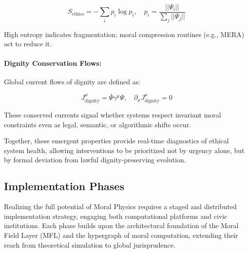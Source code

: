 \documentclass{article}
\theoremstyle{plain}
\theoremstyle{claimstyle}
\begin{document}
\[
S_{\text{ethics}} = -\sum_i p_i \log p_i, \quad p_i = \frac{||\Psi_i||}{\sum_j ||\Psi_j||}
\]

High entropy indicates fragmentation; moral compression routines (e.g., MERA) act to reduce it.

\paragraph{Dignity Conservation Flows:}

Global current flows of dignity are defined as:

\[
J^\mu_{\text{dignity}} = \bar{\Psi} \gamma^\mu \Psi, \quad \partial_\mu J^\mu_{\text{dignity}} = 0
\]

These conserved currents signal whether systems respect invariant moral constraints even as legal, semantic, or algorithmic shifts occur.

\bigskip

Together, these emergent properties provide real-time diagnostics of ethical system health, allowing interventions to be prioritized not by urgency alone, but by formal deviation from lawful dignity-preserving evolution.

\subsection{Implementation Phases}

Realizing the full potential of Moral Physics requires a staged and distributed implementation strategy, engaging both computational platforms and civic institutions. Each phase builds upon the architectural foundation of the Moral Field Layer (MFL) and the hypergraph of moral computation, extending their reach from theoretical simulation to global jurisprudence.
\end{document}
